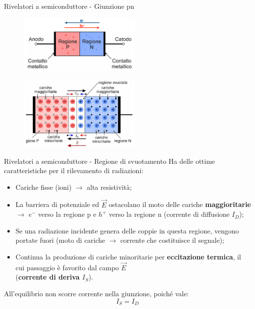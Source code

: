 \documentclass{beamer}
\begin{document}
\begin{frame}{Rivelatori a semiconduttore - Giunzione pn}
    \begin{figure}
\includegraphics[width=6cm]{images/giunzione_pn_1.PNG}
\end{figure}  
\begin{figure}
\includegraphics[width=6cm]{images/giunzione_pn_2.PNG}
\end{figure}  
\end{frame}

\begin{frame}{Rivelatori a semiconduttore - Regione di svuotamento}
    Ha delle ottime caratteristiche per il rilevamento di radiazioni:
    \begin{itemize}
        \item Cariche fisse (ioni) $\to$ alta resistività;
        \item La barriera di potenziale ed $\overrightarrow{E}$ ostacolano il moto delle cariche \textbf{maggioritarie} $\to$ $e^-$ verso la regione p e $h^+$ verso la regione n (corrente di diffusione $I_D$);
        \item Se una radiazione incidente genera delle coppie in questa regione, vengono portate fuori (moto di cariche $\to$ corrente che costituisce il segnale);
        \item Continua la produzione di cariche minoritarie per \textbf{eccitazione termica}, il cui passaggio è favorito dal campo $\overrightarrow{E}$ \\ (\textbf{corrente di deriva $I_S$}).
    \end{itemize}
    All'equilibrio non scorre corrente nella giunzione, poiché vale:
    \begin{equation*}
        I_S = I_D
    \end{equation*}
\end{frame}
\end{document}
